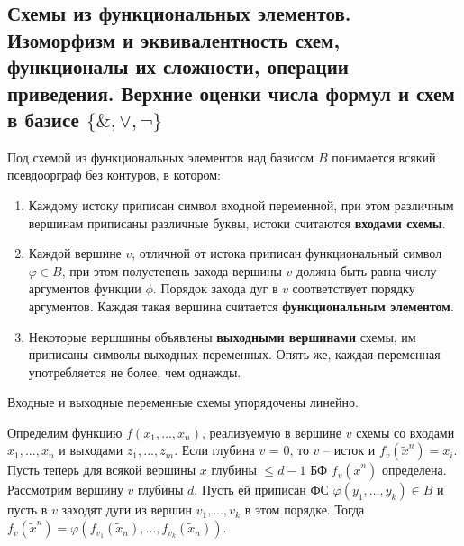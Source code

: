 \documentclass[11pt]{article}
\begin{document}
\subsection{Схемы из функциональных элементов. Изоморфизм и эквивалентность схем, функционалы их сложности, операции приведения. Верхние оценки числа формул и схем в базисе \(\{\&, \vee, \neg\}\)}
\label{sec:orgfe8cecc}
Под схемой из функциональных элементов над базисом \(B\) понимается всякий псевдоорграф без контуров, в котором:
\begin{enumerate}
\item Каждому истоку приписан символ входной переменной, при этом различным вершинам приписаны различные буквы, истоки считаются \textbf{входами схемы}.
\item Каждой вершине \(v\), отличной от истока приписан функциональный символ \(\varphi \in B\), при этом полустепень захода вершины \(v\) должна быть равна числу аргументов функции \(\phi\). Порядок захода дуг в \(v\) соответствует порядку аргументов. Каждая такая вершина считается \textbf{функциональным элементом}.
\item Некоторые вершшины объявлены \textbf{выходными вершинами} схемы, им приписаны символы выходных переменных. Опять же, каждая переменная употребляется не более, чем однажды.
\end{enumerate}
Входные и выходные переменные схемы упорядочены линейно.

Определим функцию \(f(x_1, \ldots, x_n)\), реализуемую в вершине \(v\) схемы со входами
\(x_1, \ldots, x_n\) и выходами \(z_1, \ldots, z_m\). Если глубина \(v\) = 0, то \(v\) -- исток и
\(f_v(\tilde{x}^n) = x_i\). Пусть теперь для всякой вершины \(x\) глубины \(\leq d - 1\) БФ
\(f_v(\tilde{x}^n)\) определена. Рассмотрим вершину \(v\) глубины \(d\). Пусть ей приписан ФС
\(\varphi(y_1, \ldots, y_k) \in B\) и пусть в \(v\) заходят дуги из вершин \(v_1, \ldots, v_k\)
в этом порядке. Тогда \(f_v(\tilde{x}^n) = \varphi(f_{v_1}(\tilde{x}_n), \ldots, f_{v_k}(\tilde{x}_n))\).
\end{document}
